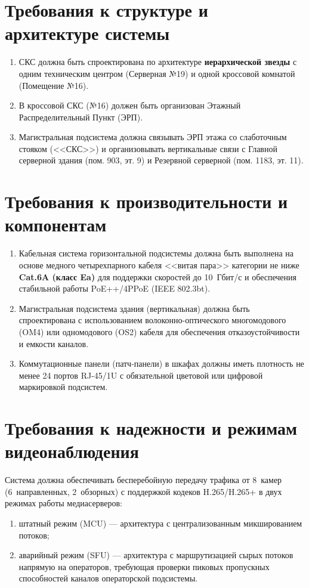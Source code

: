\documentclass[a4paper,oneside,14pt]{extreport}
\begin{document}
\begin{appendices}

\section{Требования к структуре и архитектуре системы}
\begin{enumerate}[label=\arabic{section}.\arabic*]
    \item СКС должна быть спроектирована по архитектуре \textbf{иерархической звезды} с одним техническим центром (Серверная №19) и одной кроссовой комнатой (Помещение №16).
    \item В кроссовой СКС (№16) должен быть организован Этажный Распределительный Пункт (ЭРП).
    \item Магистральная подсистема должна связывать ЭРП этажа со слаботочным стояком (<<СКС>>) и организовывать вертикальные связи с Главной серверной здания (пом. 903, эт. 9) и Резервной серверной (пом. 1183, эт. 11).
\end{enumerate}

\section{Требования к производительности и компонентам}
\begin{enumerate}[label=\arabic{section}.\arabic*]
    \item Кабельная система горизонтальной подсистемы должна быть выполнена на основе медного четырехпарного кабеля <<витая пара>> категории не ниже \textbf{Cat.6A (класс Ea)} для поддержки скоростей до 10~Гбит/с и обеспечения стабильной работы PoE++/4PPoE (IEEE 802.3bt).
    \item Магистральная подсистема здания (вертикальная) должна быть спроектирована с использованием волоконно-оптического многомодового (OM4) или одномодового (OS2) кабеля для обеспечения отказоустойчивости и емкости каналов.
    \item Коммутационные панели (патч-панели) в шкафах должны иметь плотность не менее 24 портов RJ-45/1U с обязательной цветовой или цифровой маркировкой подсистем.
\end{enumerate}

\section{Требования к надежности и режимам видеонаблюдения}
Система должна обеспечивать бесперебойную передачу трафика от 8~камер (6~направленных, 2~обзорных) с поддержкой кодеков H.265/H.265+ в двух режимах работы медиасерверов:
\begin{enumerate}[label=\asbuk*)]
    \item штатный режим (MCU) --- архитектура с централизованным микшированием потоков;
    \item аварийный режим (SFU) --- архитектура с маршрутизацией сырых потоков напрямую на операторов, требующая проверки пиковых пропускных способностей каналов операторской подсистемы.
\end{enumerate}


\end{appendices}
\end{document}
